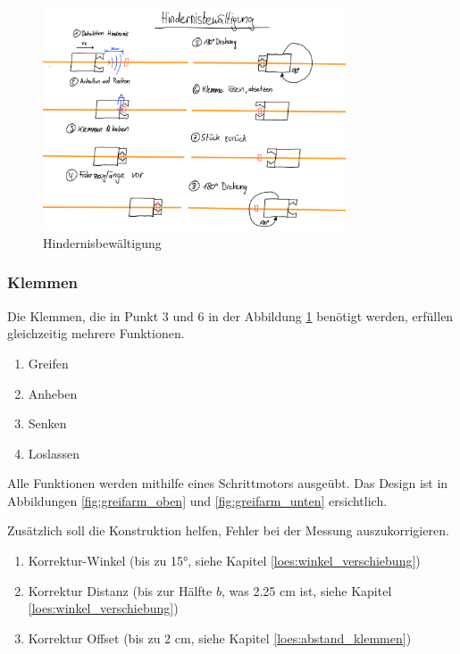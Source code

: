 \documentclass[../main.tex]{subfiles}
\begin{document}
\begin{figure}[H]
\centering
\includegraphics[width=0.8\textwidth]{img/lösungskonzpet/Skizzen/Skizze_Hindernisbewältigung.png}
\caption{Hindernisbewältigung}
\label{img:Skizze_Hindernisbewältigung}
\end{figure}


\subsubsection{Klemmen}
Die Klemmen, die in Punkt 3 und 6 in der Abbildung \ref{img:Skizze_Hindernisbewältigung} benötigt werden, erfüllen gleichzeitig mehrere Funktionen.

\begin{enumerate}
    \item Greifen
    \item Anheben
    \item Senken
    \item Loslassen
\end{enumerate}

Alle Funktionen werden mithilfe eines Schrittmotors ausgeübt. Das Design ist in Abbildungen \ref{fig:greifarm_oben} und \ref{fig:greifarm_unten} ersichtlich.
\newline

Zusätzlich soll die Konstruktion helfen, Fehler bei der Messung auszukorrigieren.
\begin{enumerate}
    \item Korrektur-Winkel (bis zu 15°, siehe Kapitel \ref{loes:winkel_verschiebung})
    \item Korrektur Distanz (bis zur Hälfte $b$, was 2.25 cm ist, siehe Kapitel \ref{loes:winkel_verschiebung})
    \item Korrektur Offset (bis zu 2 cm, siehe Kapitel \ref{loes:abstand_klemmen})
\end{enumerate}
\end{document}

